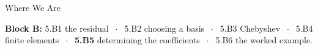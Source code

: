 

\graphicspath{{./figures/}}





\makedecktitle

\begin{frame}{Where We Are}
\vspace{-1mm}
\begin{center}
\small \textbf{Block B:} 5.B1 the residual $\;\cdot\;$ 5.B2 choosing a basis $\;\cdot\;$ 5.B3 Chebyshev $\;\cdot\;$ 5.B4 finite elements $\;\cdot\;$ \textbf{5.B5} determining the coefficients $\;\cdot\;$ 5.B6 the worked example.
\end{center}
\end{frame}

